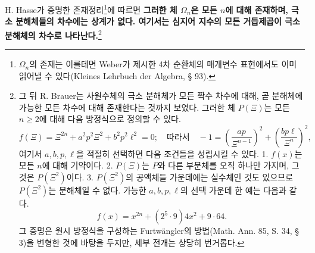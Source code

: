 \documentclass[11pt]{article}
\providecommand{\srcspaced}[1]{\textbf{#1}}
\begin{document}
H. Hasse가 증명한 존재정리\footnote{$\Omega_n$의 존재는 이를테면 Weber가 제시한 4차 순환체의 매개변수 표현에서도 이미 읽어낼 수 있다(Kleines Lehrbuch der Algebra, § 93).}에 따르면 \srcspaced{그러한 체 $\Omega_n$은 모든 $n$에 대해 존재하며, 극소 분해체들의 차수에는 상계가 없다. 여기서는 심지어 지수의 모든 거듭제곱이 극소 분해체의 차수로 나타난다.}\footnote{그 뒤 R. Brauer는 사원수체의 극소 분해체가 모든 짝수 차수에 대해, 곧 분해체에 가능한 모든 차수에 대해 존재한다는 것까지 보였다. 그러한 체 $P(\Xi)$는 모든 $n\ge2$에 대해 다음 방정식으로 정의할 수 있다.
\[
 f(\Xi)=\Xi^{2n}+a^2p^2\Xi^2+b^2p^2\ell^2=0;
\quad \text{따라서}\quad -1=\left(\frac{ap}{\Xi^{n-1}}\right)^2+
        \left(\frac{bp\ell}{\Xi^n}\right)^2,
\]
여기서 $a,b,p,\ell$을 적절히 선택하면 다음 조건들을 성립시킬 수 있다. 1. $f(x)$는 모든 $n$에 대해 기약이다. 2. $P(\Xi)$는 $P$와 다른 부분체를 오직 하나만 가지며, 그것은 $P(\Xi^2)$이다. 3. $P(\Xi^2)$의 공액체들 가운데에는 실수체인 것도 있으므로 $P(\Xi^2)$는 분해체일 수 없다. 가능한 $a,b,p,\ell$의 선택 가운데 한 예는 다음과 같다.
\[
        f(x)=x^{2n}+(2^5\cdot9)4x^2+9\cdot64.
\]
그 증명은 원시 방정식을 구성하는 Furtwängler의 방법(Math. Ann. 85, S. 34, § 3)을 변형한 것에 바탕을 두지만, 세부 전개는 상당히 번거롭다.}
\end{document}
